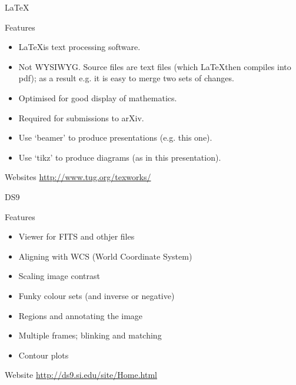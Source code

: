 \documentclass{beamer}
\begin{document}
\begin{frame}{\LaTeX}
  \begin{block}{Features}
    \begin{itemize}
      \item \LaTeX is text processing software.
      \item Not WYSIWYG. Source files are text files (which \LaTeX then compiles into pdf); as a result e.g. it is easy to merge two sets of changes.
      \item Optimised for good display of mathematics.
      \item Required for submissions to arXiv.
      \item Use `beamer' to produce presentations (e.g. this one).
      \item Use `tikz' to produce diagrams (as in this presentation).
    \end{itemize}
  \end{block}
  \begin{block}{Websites}
    \url{http://www.tug.org/texworks/}
  \end{block}
\end{frame}

\begin{frame}{DS9}
  \begin{block}{Features}
   \begin{itemize}
    \item{Viewer for FITS and othjer files}
    \item{Aligning with WCS (World Coordinate System)}
    \item{Scaling image contrast}
    \item{Funky colour sets (and inverse or negative)}
    \item{Regions and annotating the image}
    \item{Multiple frames; blinking and matching}    
    \item{Contour plots}
  \end{itemize}
  \end{block}
  \begin{block}{Website}
    \url{http://ds9.si.edu/site/Home.html}
  \end{block}
\end{frame}
\end{document}

